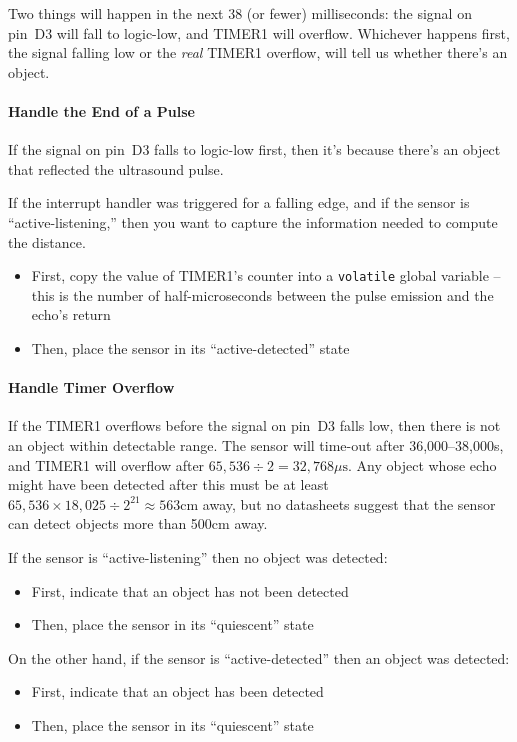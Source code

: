 Two things will happen in the next 38 (or fewer) milliseconds: the signal on pin~D3 will fall to logic-low, and TIMER1 will overflow.
Whichever happens first, the signal falling low or the \textit{real} TIMER1 overflow, will tell us whether there's an object.

\paragraph{Handle the End of a Pulse}
If the signal on pin~D3 falls to logic-low first, then it's because there's an object that reflected the ultrasound pulse.

If the interrupt handler was triggered for a falling edge, and if the sensor is ``active-listening,'' then you want to capture the information needed to compute the distance.
\begin{itemize}
    \item First, copy the value of TIMER1's counter into a \lstinline{volatile} global variable -- this is the number of half-microseconds between the pulse emission and the echo's return
    \item Then, place the sensor in its ``active-detected'' state
\end{itemize}

\paragraph{Handle Timer Overflow}

If the TIMER1 overflows before the signal on pin~D3 falls low, then there is not an object within detectable range.
The sensor will time-out after 36,000--38,000\textmu s, and TIMER1 will overflow after $65,536 \div 2 = 32,768\mu \mathrm{s}$.
Any object whose echo might have been detected after this must be at least $65,536 \times 18,025 \div 2^{21} \approx 563\mathrm{cm}$ away, but no datasheets suggest that the sensor can detect objects more than 500cm away.

If the sensor is ``active-listening'' then no object was detected:
\begin{itemize}
    \item First, indicate that an object has not been detected
    \item Then, place the sensor in its ``quiescent'' state
\end{itemize}

On the other hand, if the sensor is ``active-detected'' then an object was detected:
\begin{itemize}
    \item First, indicate that an object has been detected
    \item Then, place the sensor in its ``quiescent'' state
\end{itemize}

